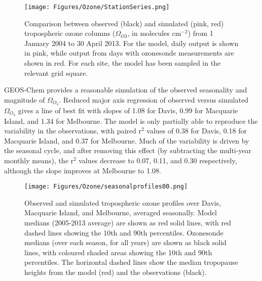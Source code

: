   \begin{figure}
    \texttt{[image: Figures/Ozone/StationSeries.png]}
    \caption{Comparison between observed (black) and simulated (pink, red) tropospheric ozone columns ($\Omega_{O3}$, in molecules cm$^{-2}$) from 1 January 2004 to 30 April 2013.
      For the model, daily output is shown in pink, while output from days with ozonesonde measurements are shown in red.
      For each site, the model has been sampled in the relevant grid square.}
    \label{Ozone:fig:StationSeriesGEOSChem}
  \end{figure}
  
  GEOS-Chem provides a reasonable simulation of the observed seasonality and magnitude of $\Omega_{O_3}$.
  Reduced major axis regression of observed versus simulated $\Omega_{O_3}$ gives a line of best fit with slopes of 1.08 for Davis, 0.99 for Macquarie Island, and 1.34 for Melbourne.
  The model is only partially able to reproduce the variability in the observations, with paired r$^2$ values of 0.38 for Davis, 0.18 for Macquarie Island, and 0.37 for Melbourne.
  Much of the variability is driven by the seasonal cycle, and after removing this effect (by subtracting the multi-year monthly means), the r$^2$ values decrease to 0.07, 0.11, and 0.30 respectively, although the slope improves at Melbourne to 1.08.
  
  \begin{figure}
    \texttt{[image: Figures/Ozone/seasonalprofiles00.png]}
    \caption{%
      Observed and simulated tropospheric ozone profiles over Davis, Macquarie Island, and Melbourne, averaged seasonally.
      Model medians (2005-2013 average) are shown as red solid lines, with red dashed lines showing the 10th and 90th percentiles.
      Ozonesonde medians (over each season, for all years) are shown as black solid lines, with coloured shaded areas showing the 10th and 90th percentiles.
      The horizontal dashed lines show the median tropopause heights from the model (red) and the observations (black).}
    \label{Ozone:fig:GEOSChemSeasonalProfiles}
  \end{figure}
  
